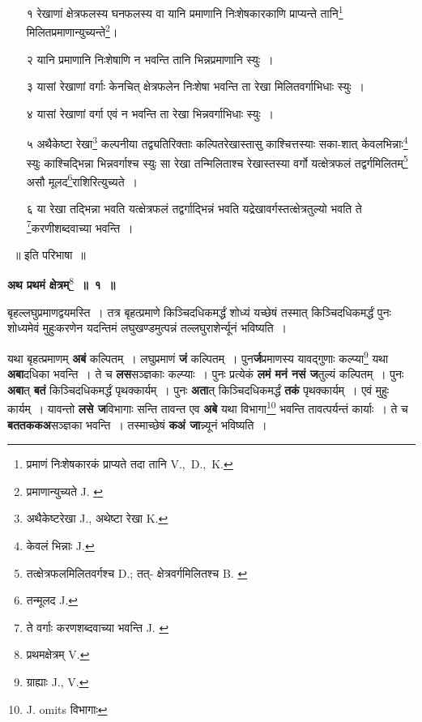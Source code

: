 \documentclass[11pt, openany]{book}
\begin{document}
\begin{enumerate}
\item[१] रेखाणां क्षेत्रफलस्य घनफलस्य वा यानि प्रमाणानि निःशेषकारकाणि प्राप्यन्ते तानि\renewcommand{\thefootnote}{२}\footnote{प्रमाणं निःशेषकारकं प्राप्यते तदा तानि {\en V.,~D.,~K.}} मिलितप्रमाणान्युच्यन्ते\renewcommand{\thefootnote}{३}\footnote{प्रमाणान्युच्यते {\en J. }}\;। 
\item[२] यानि प्रमाणानि निःशेषाणि न भवन्ति तानि भिन्नप्रमाणानि स्युः~। 
\item[३] यासां रेखाणां वर्गाः केनचित् क्षेत्रफलेन निःशेषा भवन्ति ता रेखा मिलितवर्गाभिधाः स्युः~। 
\item[४] यासां रेखाणां वर्गा एवं न भवन्ति ता रेखा भिन्नवर्गाभिधाः स्युः~। 
\item[५] अथैकेष्टा रेखा\renewcommand{\thefootnote}{४}\footnote{अथैकेष्टरेखा {\en J.}, अथेष्टा रेखा {\en K.}} कल्पनीया तद्व्यतिरिक्ताः कल्पितरेखास्तासु काश्चित्तस्याः सका-शात् केवलभिन्नाः\renewcommand{\thefootnote}{५}\footnote{केवलं भिन्नाः {\en J.}} स्युः काश्चिद्भिन्ना भिन्नवर्गाश्च
स्युः सा रेखा तन्मिलिताश्च रेखास्तस्या वर्गो यत्क्षेत्रफलं तद्वर्गमिलितम्\renewcommand{\thefootnote}{६}\footnote{तत्क्षेत्रफलमिलितवर्गश्च {\en D.}; तत्-
क्षेत्रवर्गमिलितश्च {\en B. }} असौ मूलद\renewcommand{\thefootnote}{७}\footnote{तन्मूलद {\en J.}}राशिरित्युच्यते~। 
\item[६] या रेखा तद्भिन्ना भवति यत्क्षेत्रफलं तद्वर्गाद्भिन्नं भवति यद्रेखावर्गस्तत्क्षेत्रतुल्यो भवति ते \renewcommand{\thefootnote}{८}\footnote{ते वर्गाः करणशब्दवाच्या भवन्ति
{\en J. }}करणीशब्दवाच्या भवन्ति~। 
\end{enumerate}
\begin{center}
~॥ इति परिभाषा~॥ 
\vspace{5mm}

\textbf{\large अथ प्रथमं क्षेत्रम्}\renewcommand{\thefootnote}{९}\footnote{प्रथमक्षेत्रम् {\en V.}}\textbf{\large ~॥~१~॥}
\end{center}

{\ab  बृहल्लघुप्रमाणद्वयमस्ति~। तत्र बृहत्प्रमाणे किञ्चिदधिकमर्द्धं 
शोध्यं यच्छेषं तस्मात् किञ्चिदधिकमर्द्धं पुनः शोध्यमेवं मुहुःकरणेन यदन्तिमं लघुखण्डमुत्पन्नं तल्लघुराशेर्न्यूनं भविष्यति~। }

\newpage
 यथा बृहत्प्रमाणम् \textbf{अबं} कल्पितम्~। लघुप्रमाणं \textbf{जं} कल्पितम्~। पुन\textbf{र्ज}प्रमाणस्य यावद्गुणाः कल्प्या\renewcommand{\thefootnote}{१}\footnote{ग्राह्याः {\en J., V.}} यथा \textbf{अबा}दधिका भवन्ति~। ते च \textbf{लस}सञ्ज्ञकाः कल्प्याः~। पुनः प्रत्येकं \textbf{लमं मनं नसं ज}तुल्यं कल्पितम्~। पुनः \textbf{अबा}त् \textbf{बतं} किञ्चिदधिकमर्द्धं पृथक्कार्यम्~। पुनः \textbf{अता}त् किञ्चिदधिकमर्द्धं \textbf{तकं} पृथक्कार्यम्~। एवं मुहुः कार्यम्~। यावन्तो \textbf{लसे ज}विभागाः सन्ति तावन्त एव \textbf{अबे} यथा विभागा\renewcommand{\thefootnote}{२}\footnote{{\en J. omits} विभागाः} भवन्ति  तावत्पर्यन्तं कार्याः~। ते च \textbf{बततककअ}सञ्ज्ञका भवन्ति~। तस्माच्छेषं \textbf{कअं जा}न्न्यूनं भविष्यति~। 
\end{document}

